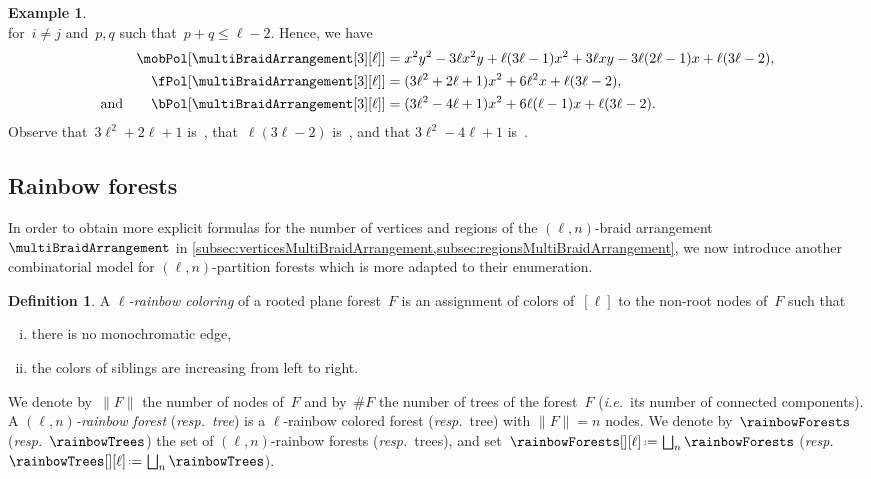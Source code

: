 \documentclass{amsart}
\newcommand{\darkblue}{\color{darkblue}} %
\newcommand{\vincenti}[1]{\todo[color=blue!30, inline]{\rm #1 \\ \hfill --- V.}}
\theoremstyle{definition}
\newtheorem{definition}[theorem]{Definition}
\newtheorem{example}[theorem]{Example}
\newcommand{\eqdef}{\mbox{\,\raisebox{0.2ex}{\scriptsize\ensuremath{\mathrm:}}\ensuremath{=}\,}} %
\newcommand{\ie}{\textit{i.e.}~} %
\newcommand{\resp}{\textit{resp.}~} %
\newcommand{\defn}[1]{\textsl{\darkblue #1}} %
\newcommand{\OEIS}[1]{\cite[{\rm \href{http://oeis.org/#1}{\texttt{#1}}}]{OEIS}}
\begin{document}
\begin{example}
\[\]
for~$i \ne j$ and~$p, q$ such that~$p + q \le \ell-2$.
Hence, we have
\begin{align*}
\mobPol[{\multiBraidArrangement[3][\ell]}] & = x^2 y^2 - 3 \ell x^2 y + \ell (3 \ell - 1) x^2 + 3 \ell x y - 3 \ell (2 \ell - 1) x + \ell (3 \ell - 2) , \\
\fPol[{\multiBraidArrangement[3][\ell]}] & = (3 \ell^2 + 2 \ell + 1) x^2 + 6 \ell^2 x + \ell (3 \ell - 2), \\
\text{and}\qquad
\bPol[{\multiBraidArrangement[3][\ell]}] & = (3 \ell^2 - 4 \ell + 1) x^2 + 6 \ell (\ell - 1) x + \ell (3 \ell - 2).
\end{align*}
Observe that~$3 \ell^2 + 2 \ell + 1$ is~\OEIS{A056109}, that~$\ell (3 \ell - 2)$ is~\OEIS{A000567}, and that ${3 \ell^2 - 4 \ell + 1}$ is~\OEIS{A045944}.
\end{example}


\subsection{Rainbow forests}
\label{subsec:rainbowForests}

In order to obtain more explicit formulas for the number of vertices and regions of the $(\ell,n)$-braid arrangement~$\multiBraidArrangement$ in \cref{subsec:verticesMultiBraidArrangement,subsec:regionsMultiBraidArrangement}, we now introduce another combinatorial model for $(\ell,n)$-partition forests which is more adapted to their enumeration.

\begin{definition}
\label{def:rainbowForest}
A \defn{$\ell$-rainbow coloring} of a rooted plane forest~$F$ is an assignment of colors of~$[\ell]$ to the non-root nodes of~$F$ such that
\begin{enumerate}[(i)]
\item there is no monochromatic edge,
\item the colors of siblings are increasing from left to right.
\end{enumerate}
We denote by~$\|F\|$ the number of nodes of~$F$ and by~$\#F$ the number of trees of the forest~$F$ (\ie its number of connected components).
A \defn{$(\ell,n)$-rainbow forest} (\resp \defn{tree}) is a \mbox{$\ell$-rainbow} colored forest (\resp tree) with $\|F\| = n$ nodes.
We denote by~$\rainbowForests$ (\resp $\rainbowTrees$) the set of $(\ell,n)$-rainbow forests (\resp trees), and set~$\rainbowForests[][\ell] \eqdef \bigsqcup_n \rainbowForests$ (\resp $\rainbowTrees[][\ell] \eqdef \bigsqcup_n \rainbowTrees$).
\end{definition}
\end{document}
